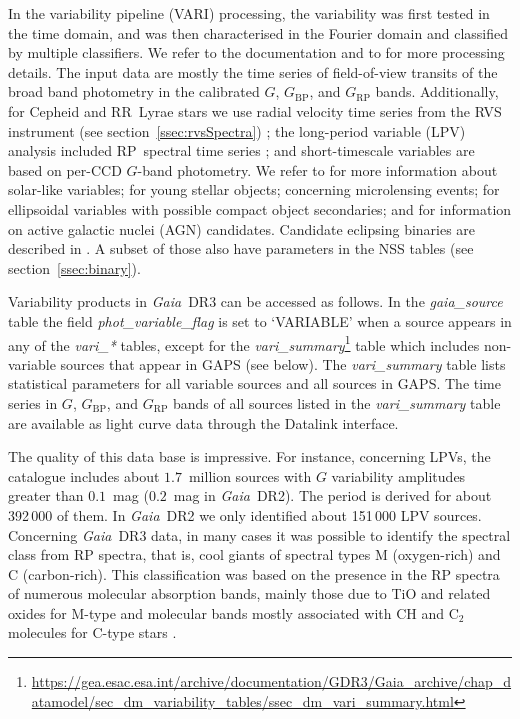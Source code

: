 \documentclass[longauth]{aa}
\makeatletter
\providecommand\gmag{\ensuremath{G}\xspace}
\providecommand\gbp{\ensuremath{G_\mathrm{BP}}\xspace}
\providecommand\grp{\ensuremath{G_\mathrm{RP}}\xspace}
\providecommand\gdrtwo{\textit{Gaia}~DR2\xspace}
\providecommand\gdrthree{\textit{Gaia}~DR3\xspace}
\providecommand\gdr[1]{\textit{Gaia}~DR#1\xspace}
\providecommand{\linktodoc}{https://gea.esac.esa.int/archive/documentation/GDR3}
\providecommand{\gstable}[1]{\url{\linktodoc/Gaia_archive/chap_datamodel/sec_dm_main_source_catalogue/ssec_dm_#1.html}}%
\providecommand{\varitable}[1]{\url{\linktodoc/Gaia_archive/chap_datamodel/sec_dm_variability_tables/ssec_dm_#1.html}}%
\DeclareRobustCommand*{\fieldName}[1]{%
  \begingroup\@fieldName\scantokens{\texttt{\small {#1}}\noexpand}\endgroup}
\makeatother
\begin{document}
In the variability pipeline (VARI) processing, the variability was first tested in the time domain, and was then  characterised in the Fourier domain and classified by multiple classifiers. We refer to the documentation and to \citet[][and references therein]{DR3-DPACP-162} for more processing details. The input data  are  mostly the time series of field-of-view  transits of the broad band photometry in the calibrated \gmag, \gbp, and \grp bands. Additionally,  for Cepheid and RR~Lyrae stars we use radial velocity time series from the RVS instrument (see section~\ref{ssec:rvsSpectra}) \citep{DR3-DPACP-169, DR3-DPACP-168};  the long-period variable (LPV) analysis included RP~spectral time series \citep[which are not part of \gdr{3},][]{DR3-DPACP-171}; and  short-timescale variables are based on per-CCD \gmag-band photometry. We refer  to \citet{DR3-DPACP-173}  for more information about solar-like variables; \citet{DR3-DPACP-172} for young stellar objects; \citet{DR3-DPACP-166} concerning microlensing events; \citet{DR3-DPACP-174} for ellipsoidal variables with possible compact object secondaries; and  \citet{DR3-DPACP-167} for information on active galactic nuclei (AGN) candidates.
Candidate eclipsing binaries are described in \citet{DR3-DPACP-170}. A subset of those also have parameters in the NSS tables (see section~\ref{ssec:binary}). 

Variability products in \gdrthree can be accessed as follows. In the \textit{gaia\_source} table the field  \textit{phot\_variable\_flag} %
is set to `VARIABLE' when a source appears in any of the \textit{vari\_*} tables, except for the \textit{vari\_summary}\footnote{\varitable{vari\_summary}} table which includes non-variable sources that appear in GAPS (see below). The \textit{vari\_summary} table lists statistical parameters for all variable sources and all sources in GAPS.
The time series in \gmag, \gbp, and \grp bands of all sources listed in the \textit{vari\_summary} table are available  as light curve data through the Datalink interface.  

The quality of this data base is impressive. For instance, concerning LPVs, the catalogue includes about $1.7$~million sources with \gmag variability amplitudes greater than $0.1$~mag ($0.2$~mag in \gdrtwo). The period is derived for about 392\,000 of them. In \gdrtwo we only identified about 151\,000 LPV sources. 
Concerning \gdrthree data, in many cases it was possible to identify the spectral class from RP spectra, that is, cool giants of spectral types M (oxygen-rich) and C (carbon-rich). This classification was based on  the presence in the RP spectra of  numerous molecular absorption bands, mainly those due to TiO and related oxides for M-type and molecular bands mostly associated with CH and C$_2$ molecules for C-type stars \citep{DR3-DPACP-171}.
\end{document}
